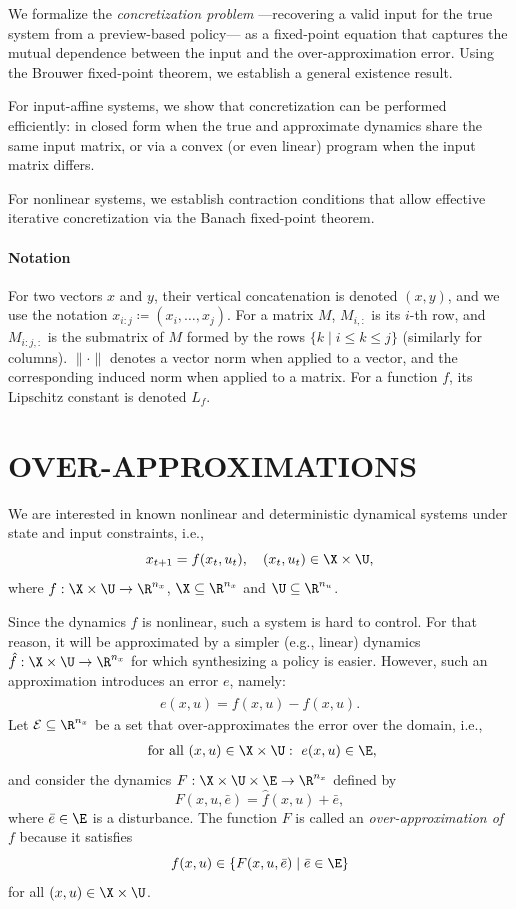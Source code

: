 \documentclass[letterpaper, 10 pt, conference]{ieeeconf}  %
\begin{document}
We formalize the \emph{concretization problem} ---recovering a valid input for the true system from a preview-based policy--- as a fixed-point equation that captures the mutual dependence between the input and the over-approximation error. Using the Brouwer fixed-point theorem, we establish a general existence result.

For input-affine systems, we show that concretization can be performed efficiently: in closed form when the true and approximate dynamics share the same input matrix, or via a convex (or even linear) program when the input matrix differs.

For nonlinear systems, we establish contraction conditions that allow effective iterative concretization via the Banach fixed-point theorem.

\paragraph{Notation}
For two vectors $x$ and $y$, their vertical concatenation is denoted $(x,y)$, and we use the notation $x_{i:j}\coloneqq (x_i,\dots, x_j)$. For a matrix $M$, $M_{i,:}$ is its $i$-th row, and $M_{i:j,:}$ is the submatrix of $M$ formed by the rows $\{k\mid i\leq k\leq j\}$ (similarly for columns). $\|\cdot\|$ denotes a vector norm when applied to a vector, and the corresponding induced norm when applied to a matrix. For a function $f$, its Lipschitz constant is denoted $L_f$.


\section{OVER-APPROXIMATIONS}

We are interested in known nonlinear and deterministic dynamical systems under state and input constraints, i.e.,
\begin{equation}\label{eq:nonlinearSystem}
x_{t+1}=f(x_t,u_t),\ \ \ (x_t,u_t)\in\X\times\U,
\end{equation}
where $f:\X\times\U\rightarrow\R^{n_x}$, $\X\subseteq\R^{n_x}$ and $\U\subseteq\R^{n_u}$.

Since the dynamics $f$ is nonlinear, such a system is hard to control. For that reason, it will be approximated by a simpler (e.g., linear) dynamics $\hat{f}:\X\times\U\rightarrow\R^{n_x}$ for which synthesizing a policy is easier. However, such an approximation introduces an error $e$, namely:
\begin{align}\label{eq:error}
e(x,u)=f(x,u)-\hat{f}(x,u).
\end{align}
Let $\mathcal{E}\subseteq\R^{n_x}$ be a set that over-approximates the error over the domain, i.e.,
\begin{align}\label{eq:errorInclusion}
\text{ for all } (x,u)\in\X\times\U:\ e(x,u)\in\E,
\end{align}
and consider the dynamics $F:\X\times\U\times\E\rightarrow\R^{n_x}$ defined by
$$
F(x,u,\bar{e})=\hat{f}(x,u)+\bar{e},
$$
where $\bar{e}\in\E$ is a disturbance. The function $F$ is called an \emph{over-approximation of $f$} because it satisfies
$$
f(x,u)\in\{F(x,u,\bar{e})\mid\bar{e}\in\E\}
$$
for all $(x,u)\in\X\times\U$.
\end{document}
